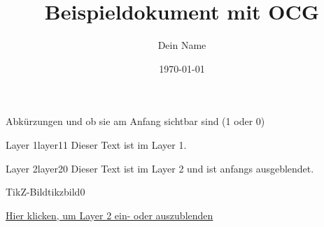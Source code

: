\documentclass{article}
\title{Beispieldokument  
 mit OCG}
\author{Dein Name}
\date{\today}
\begin{document}
\maketitle


 Abkürzungen und ob sie am Anfang sichtbar sind ({1} oder {0})
\begin{ocg}{Layer 1}{layer1}{1}
  Dieser Text ist im Layer 1.
\end{ocg}

\begin{ocg}{Layer 2}{layer2}{0}
  Dieser Text ist im Layer 2 und ist anfangs ausgeblendet.
\end{ocg}

\begin{ocg}{TikZ-Bild}{tikzbild}{0}
\end{ocg}

\hyperref[layer2]{Hier klicken, um Layer 2 ein- oder auszublenden}
\end{document}
